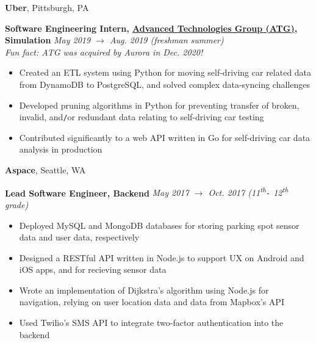 \documentclass[10pt]{article}
\begin{document}
\begin{flushleft}
		\vspace{-1.50mm}
		\textbf{Uber}, Pittsburgh, PA\\
		\begin{leftli}
			{\small \textbf{Software Engineering Intern, \href{https://www.uber.com/us/en/atg/research-and-development/perception-and-prediction/}{Advanced Technologies Group (ATG)}, Simulation}} \hfill \textit{\small May 2019 $\rightarrow$ Aug. 2019 (freshman summer)}\\
			{\footnotesize \textit{Fun fact: ATG was acquired by Aurora in Dec. 2020!}}
			\begin{itemize}
				\item Created an ETL system using Python for moving self-driving car related data from DynamoDB to PostgreSQL, and solved complex data-syncing challenges
				\vspace{-2mm}
				\item Developed pruning algorithms in Python for preventing transfer of broken, invalid, and\texttt{/}or redundant data relating to self-driving car testing
				\vspace{-2mm}
				\item Contributed significantly to a web API written in Go for self-driving car data analysis in production
			\end{itemize}
		\end{leftli}

		\vspace{-1.50mm}
		\textbf{Aspace}, Seattle, WA\\
		\begin{leftli}
			{\small \textbf{Lead Software Engineer, Backend}} \hfill \textit{\small May 2017 $\rightarrow$ Oct. 2017 (11\textsuperscript{th}\texttt{-} 12\textsuperscript{th} grade)}

			\begin{itemize}
				\item Deployed MySQL and MongoDB databases for storing parking spot sensor data and user data, respectively
				\vspace{-2mm}
				\item Designed a RESTful API written in Node.js to support UX on Android and iOS apps, and for recieving sensor data
				\vspace{-2mm}
				\item Wrote an implementation of Dijkstra's algorithm using Node.js for navigation, relying on user location data and data from Mapbox's API
				\vspace{-2mm}
				\item Used Twilio's SMS API to integrate two-factor authentication into the backend
			\end{itemize}
		\end{leftli}


\end{flushleft}
\end{document}
